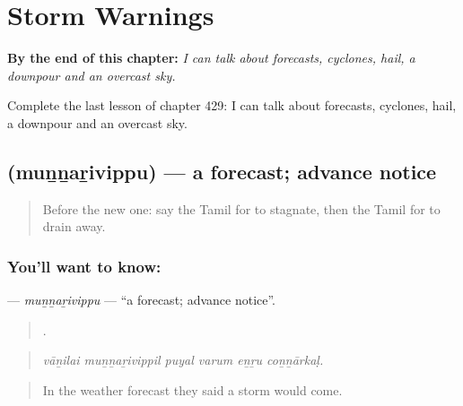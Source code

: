 
\chapter{Storm Warnings}
\label{ch:ta-storm-warnings}

\begin{chapteropening}
\textbf{By the end of this chapter:} \emph{I can talk about forecasts, cyclones, hail, a downpour and an overcast sky.}

Complete the last lesson of chapter 429: I can talk about forecasts, cyclones, hail, a downpour and an overcast sky.
\end{chapteropening}

\section[\texorpdfstring{\ta{முன்னறிவிப்பு} (muṉṉaṟivippu)}{முன்னறிவிப்பு (muṉṉaṟivippu)}]{ (muṉṉaṟivippu) — a forecast; advance notice}

\label{lesson:TA-C429-munnarivippu}



\begin{quote}
Before the new one: say the Tamil for to stagnate, then the Tamil for to drain away.
\end{quote}

\subsection*{You'll want to know: }
\textbf{} — \emph{muṉṉaṟivippu} — \textquotedblleft{}a forecast; advance notice\textquotedblright{}.

\begin{quote}
     .
\end{quote}

\begin{quote}
\emph{vāṉilai muṉṉaṟivippil puyal varum eṉṟu coṉṉārkaḷ.}
\end{quote}

\begin{quote}
In the weather forecast they said a storm would come.
\end{quote}

